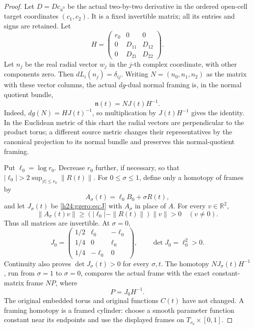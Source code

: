 \begin{proof}
Let \(D=Dc_{\overline u^0}\) be the actual two-by-two derivative in
the ordered open-cell target coordinates \((c_1,c_2)\). It is a fixed
invertible matrix; all its entries and signs are retained. Let
\[
 H=\begin{pmatrix}r_0&0&0\\0&D_{11}&D_{12}\\0&D_{21}&D_{22}\end{pmatrix}.
\]
Let \(n_j\) be the real radial vector \(w_j\) in the \(j\)-th complex
coordinate, with other components zero. Then \(dL_i(n_j)=\delta_{ij}\).
Writing \(N=(n_0,n_1,n_2)\) as the matrix with these vector columns, the actual
\(dg\)-dual normal framing is, in the normal quotient bundle,
\begin{equation}
 \mathfrak n(t)=N J(t)H^{-1}.
 \label{h24:gzero:eq:actual-frame}
\end{equation}
Indeed, \(dg(N)=HJ(t)^{-1}\), so multiplication by \(J(t)H^{-1}\)
gives the identity. In the Euclidean metric of this chart the radial
vectors are perpendicular to the product torus; a different source
metric changes their representatives by the canonical projection to its
normal bundle and preserves this normal-quotient framing.

Put \(\ell_0=\log r_0\). Decrease \(r_0\) further, if necessary, so
that \(|\ell_0|>2\sup_{|t|\leq r_0}\|R(t)\|\). For
\(0\leq\sigma\leq1\), define only a homotopy of frames by
\[
 A_\sigma(t)=\ell_0B_0+\sigma R(t),
\]
and let \(J_\sigma(t)\) be \eqref{h24:gzero:eq:J} with \(A_\sigma\) in place
of \(A\). For every \(v\in\mathbb R^2\),
\[
 \|A_\sigma(t)v\|\geq
 (|\ell_0|-\|R(t)\|)\|v\|>0\quad(v\ne0).
\]
Thus all matrices are invertible. At \(\sigma=0\),
\begin{equation}
 J_0=
 \begin{pmatrix}
 1/2&\ell_0&-\ell_0\\
 1/4&0&\ell_0\\
 1/4&-\ell_0&0
 \end{pmatrix},\qquad \det J_0=\ell_0^2>0.
 \label{h24:gzero:eq:J0}
\end{equation}
Continuity also proves \(\det J_\sigma(t)>0\) for every \(\sigma,t\).
The homotopy \(N J_\sigma(t)H^{-1}\), run from \(\sigma=1\) to
\(\sigma=0\), compares the actual frame with the exact constant-matrix
frame \(N P\), where
\begin{equation}
 P=J_0H^{-1}.
 \label{h24:gzero:eq:P}
\end{equation}
The original embedded torus and original functions \(C(t)\) have not
changed. A framing homotopy is a framed cylinder: choose a smooth
parameter function constant near its endpoints and use the displayed
frames on \(T_{r_0}\times[0,1]\).


\end{proof}
